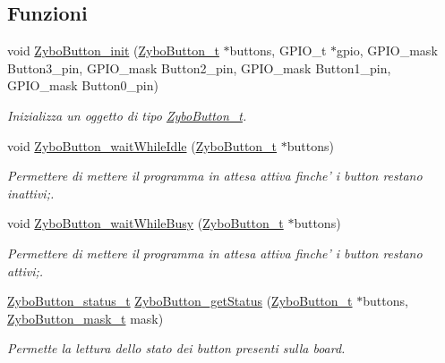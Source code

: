 \subsection*{Funzioni}
\begin{DoxyCompactItemize}
\item 
void \hyperlink{group___button_gaa40462223af93b0f5bdf2932400fe2a5}{Zybo\+Button\+\_\+init} (\hyperlink{struct_zybo_button__t}{Zybo\+Button\+\_\+t} $\ast$buttons, G\+P\+I\+O\+\_\+t $\ast$gpio, G\+P\+I\+O\+\_\+mask Button3\+\_\+pin, G\+P\+I\+O\+\_\+mask Button2\+\_\+pin, G\+P\+I\+O\+\_\+mask Button1\+\_\+pin, G\+P\+I\+O\+\_\+mask Button0\+\_\+pin)
\begin{DoxyCompactList}\small\item\em Inizializza un oggetto di tipo \hyperlink{struct_zybo_button__t}{Zybo\+Button\+\_\+t}. \end{DoxyCompactList}\item 
void \hyperlink{group___button_gaca30e81084e746785e395f79e9678e9a}{Zybo\+Button\+\_\+wait\+While\+Idle} (\hyperlink{struct_zybo_button__t}{Zybo\+Button\+\_\+t} $\ast$buttons)
\begin{DoxyCompactList}\small\item\em Permettere di mettere il programma in attesa attiva finche' i button restano inattivi;. \end{DoxyCompactList}\item 
void \hyperlink{group___button_ga3840edf011b5bad6302b7efc9c6326fe}{Zybo\+Button\+\_\+wait\+While\+Busy} (\hyperlink{struct_zybo_button__t}{Zybo\+Button\+\_\+t} $\ast$buttons)
\begin{DoxyCompactList}\small\item\em Permettere di mettere il programma in attesa attiva finche' i button restano attivi;. \end{DoxyCompactList}\item 
\hyperlink{group___button_ga85c290bfa232cab213e69200bf78e06a}{Zybo\+Button\+\_\+status\+\_\+t} \hyperlink{group___button_ga75407539e8ba0ad3ea142496219cd083}{Zybo\+Button\+\_\+get\+Status} (\hyperlink{struct_zybo_button__t}{Zybo\+Button\+\_\+t} $\ast$buttons, \hyperlink{group___button_ga4d26a5f6cad606de534ba034e0ba42dd}{Zybo\+Button\+\_\+mask\+\_\+t} mask)
\begin{DoxyCompactList}\small\item\em Permette la lettura dello stato dei button presenti sulla board. \end{DoxyCompactList}\end{DoxyCompactItemize}


